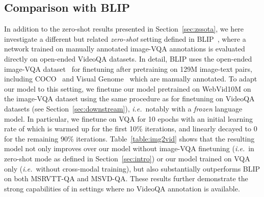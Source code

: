 \begin{table*}[!t]
\begin{center}
\caption{\small Zero-shot VideoQA results segmented per question type on the MSRVTT-QA dataset (left) and the MSVD-QA dataset (right), compared with Just Ask~\cite{yang2021just}.}
\label{table:qtype}
\end{center}
\end{table*}

\subsection{Comparison with BLIP}\label{sec:blip}
In addition to the zero-shot results presented in Section~\ref{sec:zssota}, we here investigate a different but related \textit{zero-shot} setting defined in BLIP~\cite{li2022blip}, where a network trained on manually annotated image-VQA annotations is evaluated directly on open-ended VideoQA datasets. 
In detail, BLIP uses the open-ended image-VQA dataset~\cite{antol2015vqa} for finetuning after pretraining on 129M image-text pairs, 
including COCO~\cite{chen2015microsoft} and Visual Genome~\cite{visualgenome} which are manually annotated.
To adapt our model to this setting, we finetune our model \model{} pretrained on WebVid10M on the image-VQA dataset using the same procedure as for finetuning on VideoQA datasets (see Section~\ref{sec:downstream}), \textit{i.e.}~notably with a \emph{frozen} language model.
In particular, we finetune on VQA for 10 epochs with an initial learning rate of  which is warmed up for the first 10\% iterations, and linearly decayed to 0 for the remaining 90\% iterations.
Table~\ref{table:img2vid} shows that the resulting model not only improves over our model without image-VQA finetuning (\textit{i.e.}~in zero-shot mode as defined in Section~\ref{sec:intro}) or our model trained on VQA only (\textit{i.e.}~without cross-modal training), but also substantially outperforms BLIP on both MSRVTT-QA and MSVD-QA.
These results further demonstrate the strong capabilities of \model{} in settings where no VideoQA annotation is available.

